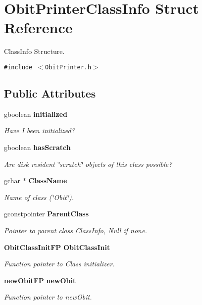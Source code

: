 \section{Obit\-Printer\-Class\-Info Struct Reference}
\label{structObitPrinterClassInfo}
Class\-Info Structure.  


{\tt \#include $<$Obit\-Printer.h$>$}

\subsection*{Public Attributes}
\begin{CompactItemize}
\item 
gboolean {\bf initialized}
\begin{CompactList}\small\item\em Have I been initialized? \item\end{CompactList}\item 
gboolean {\bf has\-Scratch}
\begin{CompactList}\small\item\em Are disk resident \char`\"{}scratch\char`\"{} objects of this class possible? \item\end{CompactList}\item 
gchar $\ast$ {\bf Class\-Name}
\begin{CompactList}\small\item\em Name of class (\char`\"{}Obit\char`\"{}). \item\end{CompactList}\item 
gconstpointer {\bf Parent\-Class}
\begin{CompactList}\small\item\em Pointer to parent class Class\-Info, Null if none. \item\end{CompactList}\item 
{\bf Obit\-Class\-Init\-FP} {\bf Obit\-Class\-Init}
\begin{CompactList}\small\item\em Function pointer to Class initializer. \item\end{CompactList}\item 
{\bf new\-Obit\-FP} {\bf new\-Obit}
\begin{CompactList}\small\item\em Function pointer to new\-Obit. \item\end{CompactList}\item 

\end{CompactItemize}
